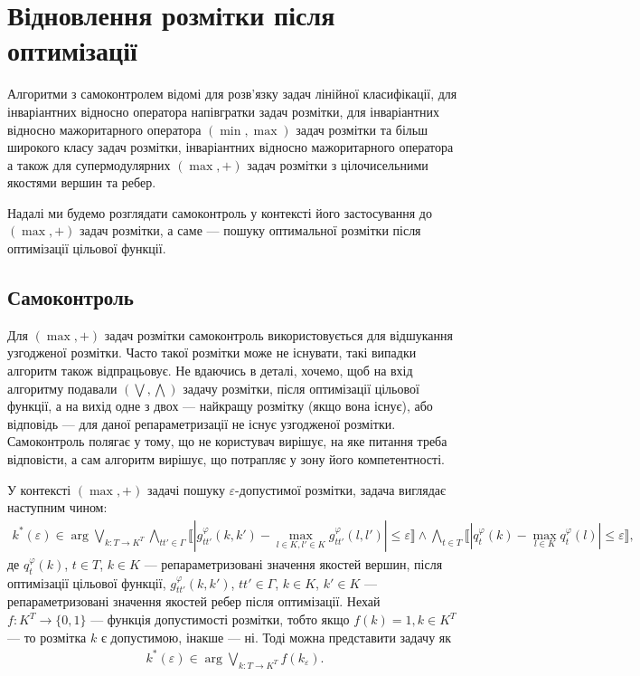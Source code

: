 \section{Відновлення розмітки після оптимізації}

Алгоритми з самоконтролем відомі для розв'язку задач лінійної
класифікації, для інваріантних відносно оператора напівгратки задач розмітки,
для інваріантних відносно мажоритарного оператора $(\min, \max)$ задач розмітки
та більш широкого класу задач розмітки, інваріантних відносно мажоритарного
оператора а також для супермодулярних $(\max,+)$
задач розмітки з цілочисельними якостями вершин та ребер.

Надалі ми будемо розглядати самоконтроль у контексті його застосування до $(\max,+)$
задач розмітки, а саме --- пошуку оптимальної розмітки після оптимізації цільової функції.

\subsection{Самоконтроль}

Для $(\max,+)$ задач розмітки самоконтроль використовується для відшукання узгодженої 
розмітки. Часто такої розмітки може не існувати, такі випадки алгоритм також відпрацьовує.
Не вдаючись в деталі, хочемо, щоб на вхід алгоритму подавали $(\bigvee, \bigwedge)$ задачу розмітки, після
оптимізації цільової функції, а на вихід одне з двох --- найкращу розмітку (якщо вона існує), або
відповідь --- для даної репараметризації не існує узгодженої розмітки.
Самоконтроль полягає у тому, що не користувач вирішує, на яке питання треба відповісти,
а сам алгоритм вирішує, що потрапляє у зону його компетентності.

У контексті $(\max,+)$ задачі пошуку $\varepsilon$-допустимої розмітки, 
задача виглядає наступним чином:
\begin{equation}
    \begin{aligned}
    k^*(\varepsilon)\in\arg\bigvee_{k:T\rightarrow K^T}\bigwedge_{tt'\in\Gamma}
    \llbracket |g^\varphi_{tt'}(k,k')-\max\limits_{l\in K, l'\in K}g^{\varphi}_{tt'}(l,l')|\leq\varepsilon\rrbracket\wedge
    \bigwedge_{t\in T}\llbracket|q^{\varphi}_t(k) - \max\limits_{l\in K}q^{\varphi}_t(l)|\leq \varepsilon\rrbracket,
\end{aligned}
\end{equation}
де $q^{\varphi}_t(k)$, $t\in T$, $k\in K$ --- репараметризовані значення якостей вершин, 
після оптимізації цільової функції, $g^\varphi_{tt'}(k,k')$, $tt'\in\Gamma$, $k\in K$, 
$k'\in K$ --- репараметризовані значення якостей ребер після оптимізації.
Нехай $f:K^T\rightarrow \{0,1\}$ --- функція допустимості розмітки, тобто якщо
$f(k)=1, k\in K^T$ --- то розмітка $k$ є допустимою, інакше --- ні. 
Тоді можна представити задачу як
\begin{equation}
    \begin{aligned}
    k^*(\varepsilon)\in\arg\bigvee_{k:T\rightarrow K^T}
    f(k_\varepsilon).
\end{aligned}
\end{equation}

